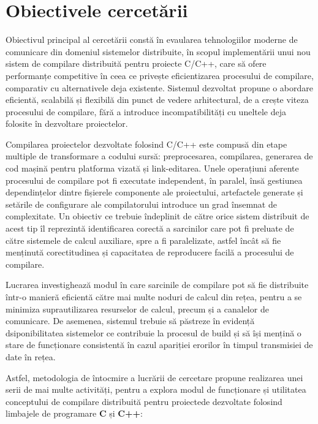\chapter{Obiectivele cercetării}

Obiectivul principal al cercetării constă în evaularea tehnologiilor
moderne de comunicare din domeniul sistemelor distribuite, în scopul
implementării unui nou sistem de compilare distribuită pentru proiecte C/C++, care
să ofere performanțe competitive în ceea ce privește eficientizarea
procesului de compilare, comparativ cu alternativele deja existente.
Sistemul dezvoltat propune o abordare eficientă, scalabilă și flexibilă
din punct de vedere arhitectural, de a crește viteza procesului de 
compilare, fără a introduce incompatibilități cu uneltele deja folosite
în dezvoltare proiectelor.

Compilarea proiectelor dezvoltate folosind C/C++ este compusă din etape
multiple de transformare a codului sursă: preprocesarea, compilarea,
generarea de cod mașină pentru platforma vizată și link-editarea. Unele 
operațiuni aferente procesului de compilare pot fi executate independent,
în paralel, însă gestiunea dependințelor dintre fișierele componente
ale proiectului, artefactele generate și setările de configurare ale compilatorului 
introduce un grad însemnat de complexitate. Un obiectiv ce trebuie 
îndeplinit de către orice sistem distribuit de acest tip îl reprezintă
identificarea corectă a sarcinilor care pot fi preluate de către sistemele
de calcul auxiliare, spre a fi paralelizate, astfel încât să fie menținută
corectitudinea și capacitatea de reproducere facilă a procesului de compilare.

Lucrarea investighează modul în care sarcinile de compilare pot să
fie distribuite într-o manieră eficientă către mai multe noduri de calcul din
rețea, pentru a se minimiza suprautilizarea resurselor de calcul, precum și a
canalelor de comunicare. De asemenea, sistemul trebuie să păstreze în evidență
dsiponibilitatea sistemelor ce contribuie la procesul de build și să își mențină
o stare de funcționare consistentă în cazul apariției erorilor în timpul 
transmisiei de date în rețea.

Astfel, metodologia de întocmire a lucrării de cercetare propune realizarea
unei serii de mai multe activități, pentru a explora modul de funcționare și
utilitatea conceptului de compilare distribuită pentru proiectede dezvoltate
folosind limbajele de programare \textbf{C} și \textbf{C++}:

\newpage

